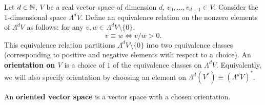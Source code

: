 \begin{definition}
  Let
    $d \in \mathbb{N}$,
    $V$ be a real vector space of dimension $d$,
    $v_0, ..., v_{d - 1} \in V$.
  Consider the $1$-dimensional space $\Lambda^d V$.
  Define an equivalence relation on the nonzero elements of $\Lambda^d V$
  as follows: for any $v, w \in \Lambda^d V \setminus \{0\}$,
  \begin{equation}
    v \equiv w \Leftrightarrow v / w > 0.
  \end{equation}
  This equivalence relation partitions $\Lambda^d V \setminus \{0\}$ into two
  equivalence classes
  (corresponding to positive and negative elements with respect to a choice).
  An \textbf{orientation on $V$} is a choice of $1$ of the equivalence classes
  on $\Lambda^d V$.
  Equivalently, we will also specify orientation by choosing an element on
  $\Lambda^d (V^*) \equiv (\Lambda^d V)^*$.

  An \textbf{oriented vector space} is a vector space with a chosen orientation.
\end{definition}
